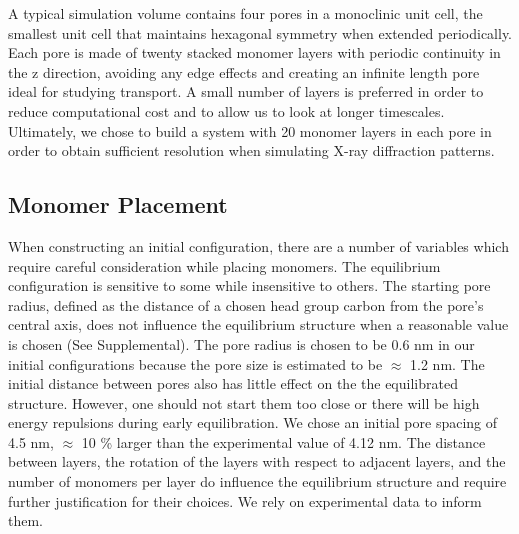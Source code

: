 \documentclass{article}
\begin{document}
  A typical simulation volume contains four pores in a monoclinic unit cell,
  the smallest unit cell that maintains hexagonal symmetry when extended
  periodically. Each pore is made of twenty stacked monomer layers with periodic
  continuity in the z direction, avoiding any edge effects and creating an
  infinite length pore ideal for studying transport. A small number of layers is
  preferred in order to reduce computational cost and to allow us to look at
  longer timescales. Ultimately, we chose to build a system with 20 monomer
  layers in each pore in order to obtain sufficient resolution when simulating
  X-ray diffraction patterns. %

\subsection{Monomer Placement} 

  When constructing an initial configuration, there are a number of variables
  which require careful consideration while placing monomers. The equilibrium
  configuration is sensitive to some while insensitive to others. The starting
  pore radius, defined as the distance of a chosen head group carbon from the
  pore's central axis, does not influence the equilibrium structure when a
  reasonable value is chosen (See Supplemental). The pore radius is chosen to be
  0.6 nm in our initial configurations because the pore size is estimated to be
  $\approx$ 1.2 nm. The initial distance between pores also has little effect on
  the the equilibrated structure. However, one should not start them too close or
  there will be high energy repulsions during early equilibration. We chose an
  initial pore spacing of 4.5 nm, $\approx$ 10 \% larger than the experimental
  value of 4.12 nm.  The distance between layers, the rotation of the layers with
  respect to adjacent layers, and the number of monomers per layer do influence
  the equilibrium structure and require further justification for their choices.
  We rely on experimental data to inform them. 
\end{document}
